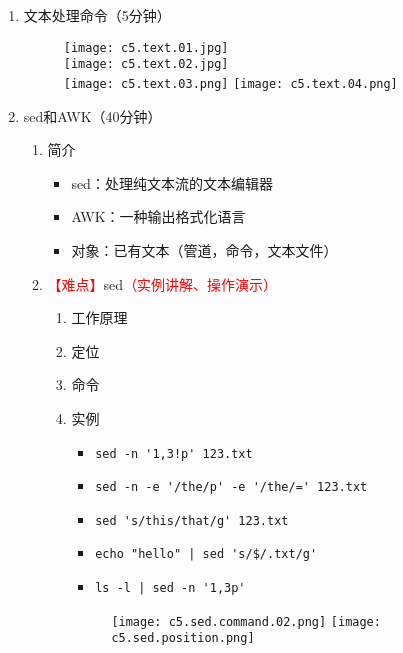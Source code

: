\documentclass{TIJMUjiaoanLL}
\begin{document}
\begin{enumerate}
\otherTail
\newpage
\otherHeader


  \item 文本处理命令（5分钟）
	\vspace*{-10pt}
	\begin{figure}[h]
	  \centering
	  \texttt{[image: c5.text.01.jpg]}\\
	  \texttt{[image: c5.text.02.jpg]}\\
	  \texttt{[image: c5.text.03.png]}
	  \texttt{[image: c5.text.04.png]}
	\end{figure}
	\vspace*{-10pt}

  \item sed和AWK（40分钟）
    \begin{enumerate}
      \item 简介
	\begin{itemize}
	  \item sed：处理纯文本流的文本编辑器
	  \item AWK：一种输出格式化语言
	  \item 对象：已有文本（管道，命令，文本文件）
	\end{itemize}
      \item \textcolor{red}{【难点】}sed\textcolor{red}{（实例讲解、操作演示）}
	\begin{enumerate}
	  \item 工作原理
	  \item 定位
	  \item 命令

\otherTail
\newpage
\otherHeader

	  \item 实例
	    \begin{itemize}
              \item \verb|sed -n '1,3!p' 123.txt|
	      \item \verb|sed -n -e '/the/p' -e '/the/=' 123.txt|
              \item \verb|sed 's/this/that/g' 123.txt|
	      \item \verb=echo "hello" | sed 's/$/.txt/g'=
              \item \verb=ls -l | sed -n '1,3p'=
	    \end{itemize}
	\vspace*{-10pt}
	\begin{figure}[h]
	  \centering
	  \hspace{1cm}
	  \texttt{[image: c5.sed.command.02.png]}
	  \texttt{[image: c5.sed.position.png]}
	\end{figure}
	\vspace*{-10pt}
	\end{enumerate}



\end{enumerate}
\end{enumerate}
\end{document}

